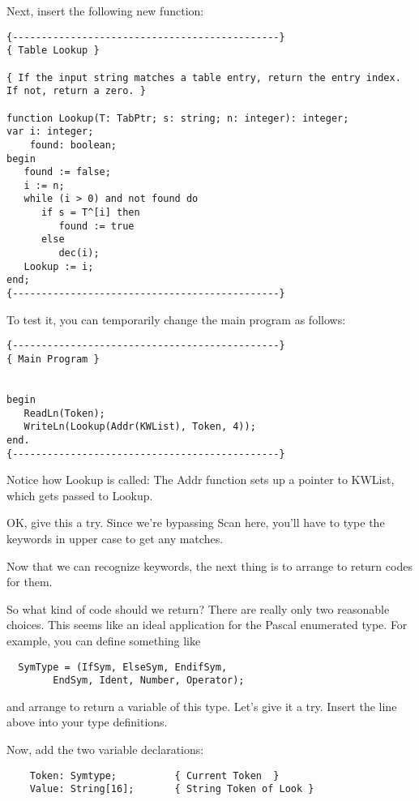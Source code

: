 Next, insert the following new function:

\begin{verbatim}
{----------------------------------------------}
{ Table Lookup }

{ If the input string matches a table entry, return the entry index. If not, return a zero. }

function Lookup(T: TabPtr; s: string; n: integer): integer;
var i: integer;
    found: boolean;
begin
   found := false;
   i := n;
   while (i > 0) and not found do
      if s = T^[i] then
         found := true
      else
         dec(i);
   Lookup := i;
end;
{----------------------------------------------}
\end{verbatim}

To test it, you  can  temporarily  change  the  main  program as follows:

\begin{verbatim}
{----------------------------------------------}
{ Main Program }


begin
   ReadLn(Token);
   WriteLn(Lookup(Addr(KWList), Token, 4));
end.
{----------------------------------------------}
\end{verbatim}

Notice how Lookup is called: The Addr function sets up  a pointer to KWList, which gets passed to Lookup.

OK, give this  a  try. Since we're bypassing Scan here, you'll have to type the keywords in upper case to get any matches.

Now that we can recognize keywords, the next thing is  to arrange to return codes for them.

So what kind of code should we return?  There are really only two reasonable choices. This seems like an ideal application for the Pascal enumerated type. For  example, you can define something like

\begin{verbatim}
  SymType = (IfSym, ElseSym, EndifSym,
        EndSym, Ident, Number, Operator);
\end{verbatim}

and arrange to return a variable of this type. Let's  give it a try. Insert the line above into your type definitions.

Now, add the two variable declarations:

\begin{verbatim}
    Token: Symtype;          { Current Token  }
    Value: String[16];       { String Token of Look }
\end{verbatim}

